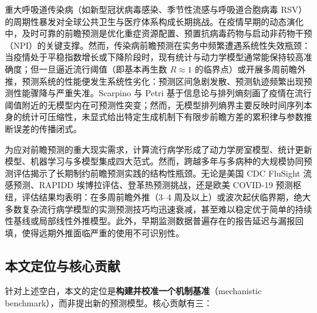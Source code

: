 \documentclass[10pt,UTF8,a4paper,zihao=-4]{ctexart}
\theoremstyle{plain}
\theoremstyle{remark}
\begin{document}
重大呼吸道传染病（如新型冠状病毒感染、季节性流感与呼吸道合胞病毒 RSV）的周期性暴发对全球公共卫生与医疗体系构成长期挑战。在疫情早期的动态演化中，及时可靠的前瞻预测是优化重症资源配置、预置抗病毒药物与启动非药物干预（NPI）的关键支撑。然而，传染病前瞻预测在实务中频繁遭遇系统性失效瓶颈：当疫情处于平稳指数增长或下降阶段时，现有统计与动力学模型通常能保持较高准确度；但一旦逼近流行阈值（即基本再生数 $R \approx 1$ 的临界点）或开展多周前瞻外推，预测系统的性能便发生系统性劣化：预测区间急剧发散、预测轨迹频繁出现预测性能骤降与严重失准\citep{reich2019collaborative}。Scarpino 与 Petri\citep{scarpino2019predictability} 基于信息论与排列熵刻画了疫情在流行阈值附近的无模型内在可预测性突变；然而，无模型排列熵界主要反映时间序列本身的统计可压缩性，未显式给出特定生成机制下有限步前瞻方差的累积律与参数推断误差的传播闭式。

为应对前瞻预测的重大现实需求，计算流行病学形成了动力学房室模型、统计更新模型、机器学习与多模型集成四大范式。然而，跨越多年与多病种的大规模协同预测评估揭示了长期制约前瞻预测实践的结构性瓶颈。无论是美国 CDC FluSight 流感预测\citep{mcgowan2019collaborative, flusight2024evaluation}、RAPIDD 埃博拉评估\citep{viboud2018rapidd}、登革热预测挑战\citep{johansson2019open}，还是欧美 COVID-19 预测枢纽\citep{cramer2022evaluation, sherratt2023europeanhubs}，评估结果均表明：在多周前瞻外推（3--4 周及以上）或波次起伏临界期，绝大多数复杂流行病学模型的实测预测技巧均迅速衰减，甚至难以稳定优于简单的持续性基线或局部线性外推模型\citep{suez2026baseline, lopez2024challenges}。此外，早期监测数据普遍存在的报告延迟与漏报回填，使得远期外推面临严重的使用不可识别性\citep{melikechi2022limits, king2015avoidable}。

\subsection{本文定位与核心贡献}\label{sec:contrib}

针对上述空白，本文的定位是\textbf{构建并校准一个机制基准}（mechanistic benchmark），而非提出新的预测模型。核心贡献有三：
\end{document}
